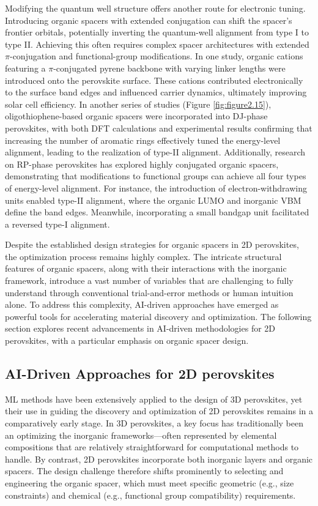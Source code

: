 Modifying the quantum well structure offers another route for electronic tuning. Introducing organic spacers with extended conjugation can shift the spacer’s frontier orbitals, potentially inverting the quantum-well alignment from type I to type II. Achieving this often requires complex spacer architectures with extended $\pi$-conjugation and functional-group modifications. In one study, organic cations featuring a $\pi$-conjugated pyrene backbone with varying linker lengths were introduced onto the perovskite surface. These cations contributed electronically to the surface band edges and influenced carrier dynamics, ultimately improving solar cell efficiency\cite{RN39}. In another series of studies (Figure \ref{fig:figure2.15}), oligothiophene-based organic spacers were incorporated into DJ-phase perovskites, with both DFT calculations and experimental results confirming that increasing the number of aromatic rings effectively tuned the energy-level alignment, leading to the realization of type-II alignment\cite{RN38,RN18}. Additionally, research on RP-phase perovskites has explored highly conjugated organic spacers, demonstrating that modifications to functional groups can achieve all four types of energy-level alignment. For instance, the introduction of electron-withdrawing units enabled type-II alignment, where the organic LUMO and inorganic VBM define the band edges. Meanwhile, incorporating a small bandgap unit facilitated a reversed type-I alignment\cite{RN20}. 

Despite the established design strategies for organic spacers in 2D perovskites, the optimization process remains highly complex. The intricate structural features of organic spacers, along with their interactions with the inorganic framework, introduce a vast number of variables that are challenging to fully understand through conventional trial-and-error methods or human intuition alone. To address this complexity, AI-driven approaches have emerged as powerful tools for accelerating material discovery and optimization. The following section explores recent advancements in AI-driven methodologies for 2D perovskites, with a particular emphasis on organic spacer design.

\subsection{AI-Driven Approaches for 2D perovskites}

ML methods have been extensively applied to the design of 3D perovskites, yet their use in guiding the discovery and optimization of 2D perovskites remains in a comparatively early stage. In 3D perovskites, a key focus has traditionally been an optimizing the inorganic frameworks—often represented by elemental compositions that are relatively straightforward for computational methods to handle\cite{RN314,RN422,RN317}. By contrast, 2D perovskites incorporate both inorganic layers and organic spacers. The design challenge therefore shifts prominently to selecting and engineering the organic spacer, which must meet specific geometric (e.g., size constraints) and chemical (e.g., functional group compatibility) requirements.

